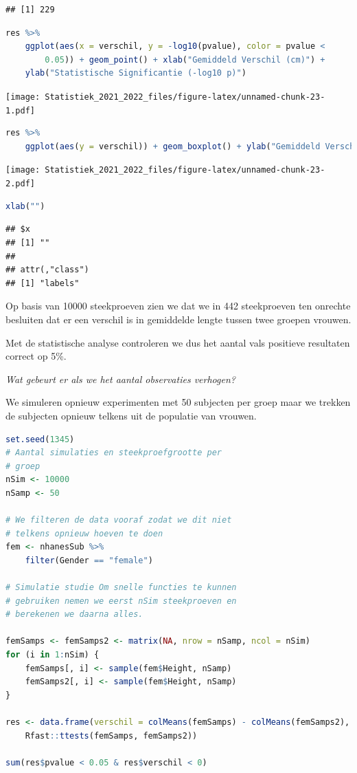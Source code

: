 \documentclass[
  12pt,dutch,coursenotes]{book}
\theoremstyle{definition}
\theoremstyle{definition}
\theoremstyle{definition}
\theoremstyle{definition}
\theoremstyle{remark}
\begin{document}
\begin{lstlisting}
## [1] 229
\end{lstlisting}

\begin{lstlisting}[language=R]
res %>%
    ggplot(aes(x = verschil, y = -log10(pvalue), color = pvalue <
        0.05)) + geom_point() + xlab("Gemiddeld Verschil (cm)") +
    ylab("Statistische Significantie (-log10 p)")
\end{lstlisting}

\texttt{[image: Statistiek\_2021\_2022\_files/figure-latex/unnamed-chunk-23-1.pdf]}

\begin{lstlisting}[language=R]
res %>%
    ggplot(aes(y = verschil)) + geom_boxplot() + ylab("Gemiddeld Verschil (cm)")
\end{lstlisting}

\texttt{[image: Statistiek\_2021\_2022\_files/figure-latex/unnamed-chunk-23-2.pdf]}

\begin{lstlisting}[language=R]
xlab("")
\end{lstlisting}

\begin{lstlisting}
## $x
## [1] ""
## 
## attr(,"class")
## [1] "labels"
\end{lstlisting}

Op basis van 10000 steekproeven zien we dat we in 442 steekproeven ten onrechte besluiten dat er een verschil is in gemiddelde lengte tussen twee groepen vrouwen.

Met de statistische analyse controleren we dus het aantal vals positieve resultaten correct op 5\%.

\emph{Wat gebeurt er als we het aantal observaties verhogen?}

We simuleren opnieuw experimenten met 50 subjecten per groep maar we trekken de subjecten opnieuw telkens uit de populatie van vrouwen.

\begin{lstlisting}[language=R]
set.seed(1345)
# Aantal simulaties en steekproefgrootte per
# groep
nSim <- 10000
nSamp <- 50

# We filteren de data vooraf zodat we dit niet
# telkens opnieuw hoeven te doen
fem <- nhanesSub %>%
    filter(Gender == "female")

# Simulatie studie Om snelle functies te kunnen
# gebruiken nemen we eerst nSim steekproeven en
# berekenen we daarna alles.

femSamps <- femSamps2 <- matrix(NA, nrow = nSamp, ncol = nSim)
for (i in 1:nSim) {
    femSamps[, i] <- sample(fem$Height, nSamp)
    femSamps2[, i] <- sample(fem$Height, nSamp)
}

res <- data.frame(verschil = colMeans(femSamps) - colMeans(femSamps2),
    Rfast::ttests(femSamps, femSamps2))

sum(res$pvalue < 0.05 & res$verschil < 0)
\end{lstlisting}
\end{document}
